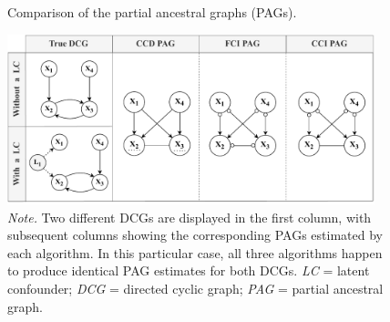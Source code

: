 \documentclass[twoside, 11pt]{article}
\newcommand*{\figref}[2][]{%
  \hyperref[{fig:#2}]{%
    Figure~\ref*{fig:#2}%
    \ifx\\#1\\%
    \else
      #1%
    \fi
  }%
}
\begin{document}

 

\begin{figure}[!t]
    \centering
        \caption{Comparison of the partial ancestral graphs (PAGs).}
        \includegraphics[width=0.95\textwidth]{figures/Fig10.pdf}
        \vspace{1mm}
        \caption*{\small{\textit{Note.} Two different DCGs are displayed in the first column, with subsequent columns showing the corresponding PAGs estimated by each algorithm. In this particular case, all three algorithms happen to produce identical PAG estimates for both DCGs.
        \textit{LC} = latent confounder; \textit{DCG} = directed cyclic graph; \textit{PAG} = partial ancestral graph.}}
    \label{fig:10}
\end{figure}
\end{document}
